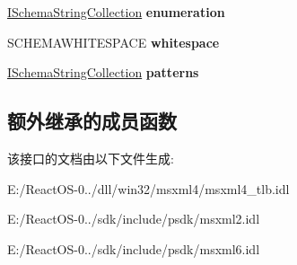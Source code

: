 \begin{DoxyCompactItemize}
\hyperlink{interface_m_s_x_m_l2_1_1_i_schema_string_collection}{I\+Schema\+String\+Collection} {\bfseries enumeration}
\item 
\mbox{\label{interface_m_s_x_m_l2_1_1_i_schema_type_ab03cc83528dd947d032a16dbf70dab24}} 
S\+C\+H\+E\+M\+A\+W\+H\+I\+T\+E\+S\+P\+A\+CE {\bfseries whitespace}
\item 
\mbox{\label{interface_m_s_x_m_l2_1_1_i_schema_type_a8a5ad294d43e57910144fb4cf7adf803}} 
\hyperlink{interface_m_s_x_m_l2_1_1_i_schema_string_collection}{I\+Schema\+String\+Collection} {\bfseries patterns}
\end{DoxyCompactItemize}
\subsection*{额外继承的成员函数}


该接口的文档由以下文件生成\+:\begin{DoxyCompactItemize}
\item 
E\+:/\+React\+O\+S-\/0../dll/win32/msxml4/msxml4\+\_\+tlb.\+idl\item 
E\+:/\+React\+O\+S-\/0../sdk/include/psdk/msxml2.\+idl\item 
E\+:/\+React\+O\+S-\/0../sdk/include/psdk/msxml6.\+idl\end{DoxyCompactItemize}
